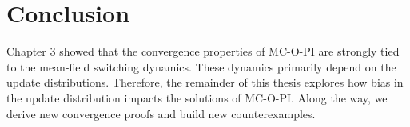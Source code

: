 \section{Conclusion}

Chapter 3 showed that the convergence properties of MC-O-PI are strongly tied to the mean-field switching dynamics.
These dynamics primarily depend on the update distributions.
Therefore, the remainder of this thesis explores how bias in the update distribution impacts the solutions of MC-O-PI.
Along the way, we derive new convergence proofs and build new counterexamples.






\clearpage